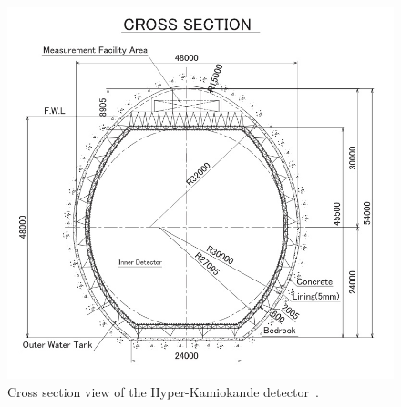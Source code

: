 \begin{figure}[h!]
  \centering
  \begin{minipage}[b]{0.59\textwidth}
    \includegraphics[width=\textwidth]{figures/hyper1.jpeg}
    \vspace{2mm}
    \caption{Cross section view of the Hyper-Kamiokande detector~\cite{24HyperK}.}
    \label{fig:hyper1}
  \end{minipage}
  \hfill
  \begin{minipage}[b]{0.39\textwidth}

\end{minipage}
\end{figure}
